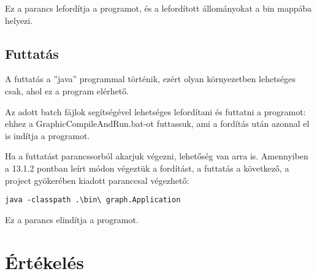 Ez a parancs lefordítja a programot, és a lefordított állományokat a bin mappába helyezi.  



\subsection{Futtatás}

A futtatás a ''java'' programmal történik, ezért olyan környezetben lehetséges csak, ahol ez a program elérhető. 

Az adott batch fájlok segítségével lehetséges lefordítani és futtatni a programot: ehhez a GraphicCompileAndRun.bat-ot futtassuk, ami a fordítás után azonnal el is indítja a programot.

Ha a futtatást parancssorból akarjuk végezni, lehetőség van arra is. Amennyiben a 13.1.2 pontban leírt módon végeztük a fordítást, a futtatás a következő, a project gyökerében kiadott paranccsal végezhető:

\begin{lstlisting}
java -classpath .\bin\ graph.Application
\end{lstlisting}
Ez a parancs elindítja a programot.

\section{Értékelés}


